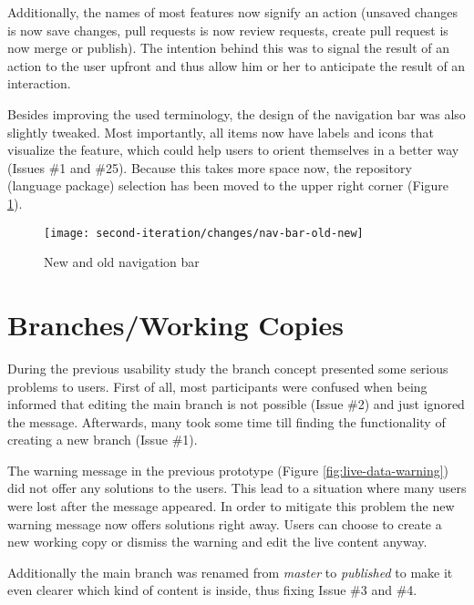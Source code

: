 Additionally, the names of most features now signify an action (unsaved changes is now save changes, pull requests is now review requests, create pull request is now merge or publish). The intention behind this was to signal the result of an action to the user upfront and thus allow him or her to anticipate the result of an interaction.

Besides improving the used terminology, the design of the navigation bar was also slightly tweaked. Most importantly, all items now have labels and icons that visualize the feature, which could help users to orient themselves in a better way (Issues \#1 and \#25). Because this takes more space now, the repository (language package) selection has been moved to the upper right corner (Figure \ref{fig:nav-bar-old-new}).

\begin{figure}[h!]
 \centering
 \texttt{[image: second-iteration/changes/nav-bar-old-new]}
 \caption{New and old navigation bar}
 \label{fig:nav-bar-old-new}
\end{figure}

\section{Branches/Working Copies}
During the previous usability study the branch concept presented some serious problems to users. First of all, most participants were confused when being informed that editing the main branch is not possible (Issue \#2) and just ignored the message. Afterwards, many took some time till finding the functionality of creating a new branch (Issue \#1).

The warning message in the previous prototype (Figure \ref{fig:live-data-warning}) did not offer any solutions to the users. This lead to a situation where many users were lost after the message appeared. In order to mitigate this problem the new warning message now offers solutions right away. Users can choose to create a new working copy or dismiss the warning and edit the live content anyway.

Additionally the main branch was renamed from \emph{master} to \emph{published} to make it even clearer which kind of content is inside, thus fixing Issue \#3 and \#4.





